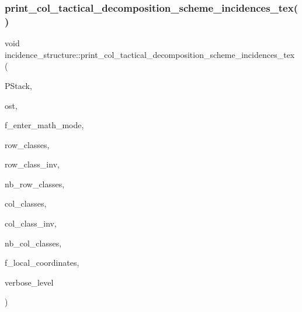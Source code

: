 \subsubsection{\texorpdfstring{print\+\_\+col\+\_\+tactical\+\_\+decomposition\+\_\+scheme\+\_\+incidences\+\_\+tex()}{print\_col\_tactical\_decomposition\_scheme\_incidences\_tex()}}
{\footnotesize\ttfamily void incidence\+\_\+structure\+::print\+\_\+col\+\_\+tactical\+\_\+decomposition\+\_\+scheme\+\_\+incidences\+\_\+tex (\begin{DoxyParamCaption}\item[{\mbox{\hyperlink{classpartitionstack}{partitionstack}} \&}]{P\+Stack,  }\item[{ostream \&}]{ost,  }\item[{\mbox{\hyperlink{galois_8h_a09fddde158a3a20bd2dcadb609de11dc}{I\+NT}}}]{f\+\_\+enter\+\_\+math\+\_\+mode,  }\item[{\mbox{\hyperlink{galois_8h_a09fddde158a3a20bd2dcadb609de11dc}{I\+NT}} $\ast$}]{row\+\_\+classes,  }\item[{\mbox{\hyperlink{galois_8h_a09fddde158a3a20bd2dcadb609de11dc}{I\+NT}} $\ast$}]{row\+\_\+class\+\_\+inv,  }\item[{\mbox{\hyperlink{galois_8h_a09fddde158a3a20bd2dcadb609de11dc}{I\+NT}}}]{nb\+\_\+row\+\_\+classes,  }\item[{\mbox{\hyperlink{galois_8h_a09fddde158a3a20bd2dcadb609de11dc}{I\+NT}} $\ast$}]{col\+\_\+classes,  }\item[{\mbox{\hyperlink{galois_8h_a09fddde158a3a20bd2dcadb609de11dc}{I\+NT}} $\ast$}]{col\+\_\+class\+\_\+inv,  }\item[{\mbox{\hyperlink{galois_8h_a09fddde158a3a20bd2dcadb609de11dc}{I\+NT}}}]{nb\+\_\+col\+\_\+classes,  }\item[{\mbox{\hyperlink{galois_8h_a09fddde158a3a20bd2dcadb609de11dc}{I\+NT}}}]{f\+\_\+local\+\_\+coordinates,  }\item[{\mbox{\hyperlink{galois_8h_a09fddde158a3a20bd2dcadb609de11dc}{I\+NT}}}]{verbose\+\_\+level }\end{DoxyParamCaption})}

\mbox{\label{classincidence__structure_a16f15115fc99c128a90c824da2915700}} 
